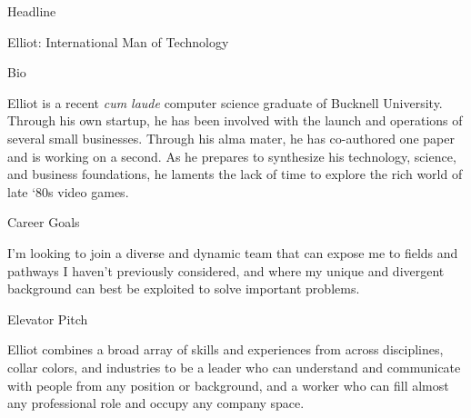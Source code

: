 \documentclass{resume} %
\begin{document}

\begin{rSection}{Headline}

Elliot: International Man of Technology \\

\end{rSection}


\begin{rSection}{Bio}

Elliot is a recent \textit{cum laude} computer science graduate of Bucknell University. Through his own startup, he has been involved with the launch and operations of several small businesses. Through his alma mater, he has co-authored one paper and is working on a second. As he prepares to synthesize his technology, science, and business foundations, he laments the lack of time to explore the rich world of late ‘80s video games. \\

\end{rSection}


\begin{rSection}{Career Goals}

I'm looking to join a diverse and dynamic team that can expose me to fields and pathways I haven't previously considered, and where my unique and divergent background can best be exploited to solve important problems. \\

\end{rSection}


\begin{rSection}{Elevator Pitch}

Elliot combines a broad array of skills and experiences from across disciplines, collar colors, and industries to be a leader who can understand and communicate with people from any position or background, and a worker who can fill almost any professional role and occupy any company space. \\

\end{rSection}
\end{document}
